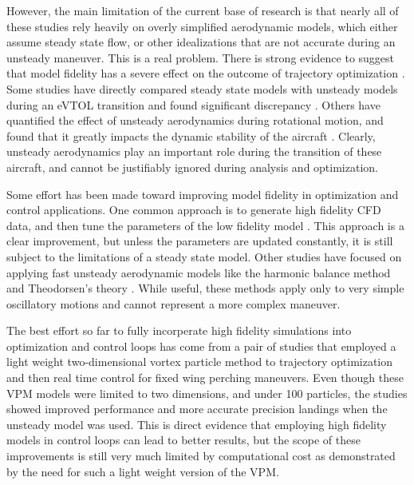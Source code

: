 \documentclass[12pt, letterpaper]{article}
\begin{document}
However, the main limitation of the current base of research is that nearly all of these studies rely heavily on overly simplified aerodynamic models, which either assume steady state flow, or other idealizations that are not accurate during an unsteady maneuver.  This is a real problem.  There is strong evidence to suggest that model fidelity has a severe effect on the outcome of trajectory optimization \cite{anderson2021acomparison}.  Some studies have directly compared steady state models with unsteady models during an eVTOL transition and found significant discrepancy \cite{tagg2024trajectory}.  Others have quantified the effect of unsteady aerodynamics during rotational motion, and found that it greatly impacts the dynamic stability of the aircraft \cite{wang2012unsteady}.  Clearly, unsteady aerodynamics play an important role during the transition of these aircraft, and cannot be justifiably ignored during analysis and optimization. 

Some effort has been made toward improving model fidelity in optimization and control applications.  One common approach is to generate high fidelity CFD data, and then tune the parameters of the low fidelity model \cite{dean2008aircraft, tian2020cfd, gortz2007towards}.  This approach is a clear improvement, but unless the parameters are updated constantly, it is still subject to the limitations of a steady state model.  Other studies have focused on applying fast unsteady aerodynamic models like the harmonic balance method \cite{thomas2004modeling} and Theodorsen's theory \cite{bhoir2004output}.  While useful, these methods apply only to very simple oscillatory motions and cannot represent a more complex maneuver.  

The best effort so far to fully incorperate high fidelity simulations into optimization and control loops has come from a pair of studies that employed a light weight two-dimensional vortex particle method to trajectory optimization \cite{perrotta2023planningcontroldynamicmorphingwing} and then real time control \cite{gupta2025realtimeplanningcontrolvortex} for fixed wing perching maneuvers.  Even though these VPM models were limited to two dimensions, and under 100 particles, the studies showed improved performance and more accurate precision landings when the unsteady model was used.  This is direct evidence that employing high fidelity models in control loops can lead to better results, but the scope of these improvements is still very much limited by computational cost as demonstrated by the need for such a light weight version of the VPM.   
\end{document}
